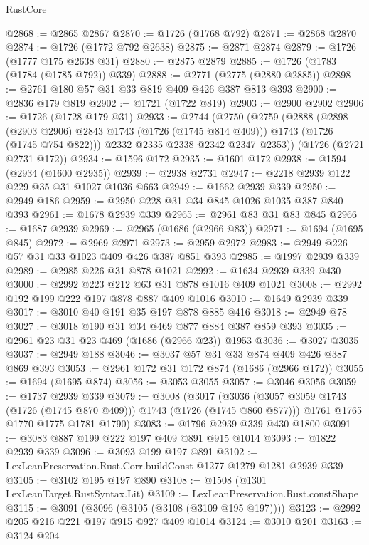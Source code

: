 \begin{lexlean}{RustCore}
\begin{coremodule}
@2868 := @2865 @2867
@2870 := @1726 (@1768 @792)
@2871 := @2868 @2870
@2874 := @1726 (@1772 @792 @2638)
@2875 := @2871 @2874
@2879 := @1726 (@1777 @175 @2638 @31)
@2880 := @2875 @2879
@2885 := @1726 (@1783 (@1784 (@1785 @792)) @339)
@2888 := @2771 (@2775 (@2880 @2885))
@2898 := @2761 @180 @57 @31 @33 @819 @409 @426 @387 @813 @393
@2900 := @2836 @179 @819
@2902 := @1721 (@1722 @819)
@2903 := @2900 @2902
@2906 := @1726 (@1728 @179 @31)
@2933 := @2744
    (@2750
      (@2759
        (@2888
          (@2898 (@2903 @2906) @2843 @1743 (@1726 (@1745 @814 @409)))
          @1743
          (@1726 (@1745 @754 @822)))
        @2332
        @2335
        @2338
        @2342
        @2347
        @2353))
    (@1726 (@2721 @2731 @172))
@2934 := @1596 @172
@2935 := @1601 @172
@2938 := @1594 (@2934 (@1600 @2935))
@2939 := @2938 @2731
@2947 := @2218 @2939 @122 @229 @35 @31 @1027 @1036 @663
@2949 := @1662 @2939 @339
@2950 := @2949 @186
@2959 := @2950 @228 @31 @34 @845 @1026 @1035 @387 @840 @393
@2961 := @1678 @2939 @339
@2965 := @2961 @83 @31 @83 @845
@2966 := @1687 @2939
@2969 := @2965 (@1686 (@2966 @83))
@2971 := @1694 (@1695 @845)
@2972 := @2969 @2971
@2973 := @2959 @2972
@2983 := @2949 @226 @57 @31 @33 @1023 @409 @426 @387 @851 @393
@2985 := @1997 @2939 @339
@2989 := @2985 @226 @31 @878 @1021
@2992 := @1634 @2939 @339 @430
@3000 := @2992 @223 @212 @63 @31 @878 @1016 @409 @1021
@3008 := @2992 @192 @199 @222 @197 @878 @887 @409 @1016
@3010 := @1649 @2939 @339
@3017 := @3010 @40 @191 @35 @197 @878 @885 @416
@3018 := @2949 @78
@3027 := @3018 @190 @31 @34 @469 @877 @884 @387 @859 @393
@3035 := @2961 @23 @31 @23 @469 (@1686 (@2966 @23)) @1953
@3036 := @3027 @3035
@3037 := @2949 @188
@3046 := @3037 @57 @31 @33 @874 @409 @426 @387 @869 @393
@3053 := @2961 @172 @31 @172 @874 (@1686 (@2966 @172))
@3055 := @1694 (@1695 @874)
@3056 := @3053 @3055
@3057 := @3046 @3056
@3059 := @1737 @2939 @339
@3079 := @3008
    (@3017
      (@3036 (@3057 @3059 @1743 (@1726 (@1745 @870 @409))) @1743 (@1726 (@1745 @860 @877)))
      @1761
      @1765
      @1770
      @1775
      @1781
      @1790)
@3083 := @1796 @2939 @339 @430 @1800
@3091 := @3083 @887 @199 @222 @197 @409 @891 @915 @1014
@3093 := @1822 @2939 @339
@3096 := @3093 @199 @197 @891
@3102 := LexLeanPreservation.Rust.Corr.buildConst @1277 @1279 @1281 @2939 @339
@3105 := @3102 @195 @197 @890
@3108 := @1508 (@1301 LexLeanTarget.RustSyntax.Lit)
@3109 := LexLeanPreservation.Rust.constShape
@3115 := @3091 (@3096 (@3105 (@3108 (@3109 @195 @197))))
@3123 := @2992 @205 @216 @221 @197 @915 @927 @409 @1014
@3124 := @3010 @201
@3163 := @3124
    @204

\end{coremodule}
\end{lexlean}
